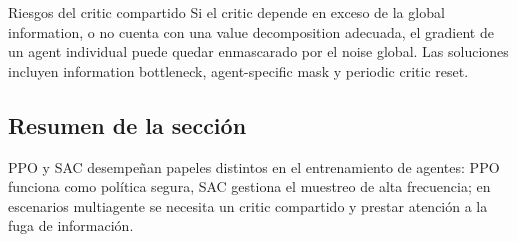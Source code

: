 \begin{warningbox}{Riesgos del critic compartido}
Si el critic depende en exceso de la global information, o no cuenta con una value decomposition adecuada, el gradient de un agent individual puede quedar enmascarado por el noise global. Las soluciones incluyen information bottleneck, agent-specific mask y periodic critic reset.
\end{warningbox}

\subsection{Resumen de la sección}

PPO y SAC desempeñan papeles distintos en el entrenamiento de agentes: PPO funciona como política segura, SAC gestiona el muestreo de alta frecuencia; en escenarios multiagente se necesita un critic compartido y prestar atención a la fuga de información.

